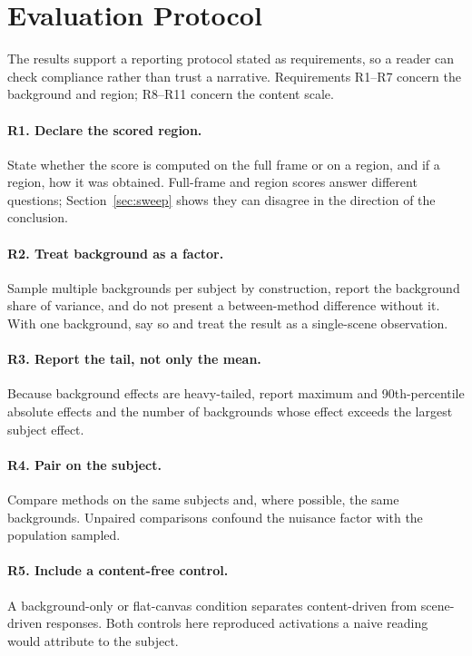 \documentclass[11pt]{article}
\begin{document}
\section{Evaluation Protocol}
\label{sec:protocol-rec}
The results support a reporting protocol stated as requirements, so a reader can check compliance rather than trust a narrative. Requirements R1--R7 concern the background and region; R8--R11 concern the content scale.

\paragraph{R1. Declare the scored region.} State whether the score is computed on the full frame or on a region, and if a region, how it was obtained. Full-frame and region scores answer different questions; Section~\ref{sec:sweep} shows they can disagree in the direction of the conclusion.

\paragraph{R2. Treat background as a factor.} Sample multiple backgrounds per subject by construction, report the background share of variance, and do not present a between-method difference without it. With one background, say so and treat the result as a single-scene observation.

\paragraph{R3. Report the tail, not only the mean.} Because background effects are heavy-tailed, report maximum and 90th-percentile absolute effects and the number of backgrounds whose effect exceeds the largest subject effect.

\paragraph{R4. Pair on the subject.} Compare methods on the same subjects and, where possible, the same backgrounds. Unpaired comparisons confound the nuisance factor with the population sampled.

\paragraph{R5. Include a content-free control.} A background-only or flat-canvas condition separates content-driven from scene-driven responses. Both controls here reproduced activations a naive reading would attribute to the subject.
\end{document}
